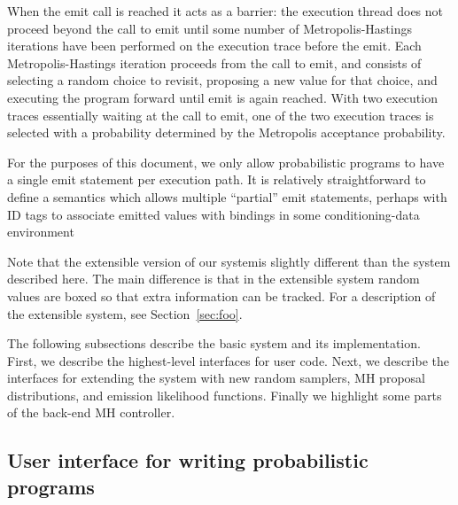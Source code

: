 \documentclass{article}
\begin{document}
When the emit call is reached it acts as a barrier: the execution thread does
not proceed beyond the call to emit until some number of Metropolis-Hastings
iterations have been performed on the execution trace before the emit.  Each
Metropolis-Hastings iteration proceeds from the call to emit, and consists of
selecting a random choice to revisit, proposing a new value for that choice,
and executing the program forward until emit is again reached. With two
execution traces essentially waiting at the call to emit, one of the two
execution traces is selected with a probability determined by the Metropolis
acceptance probability.

For the purposes of this document, we only allow probabilistic programs to have
a single emit statement per execution path. It is relatively straightforward to
define a semantics which allows multiple ``partial'' emit statements, perhaps
with ID tags to associate emitted values with bindings in some
conditioning-data environment

Note that the extensible version of our systemis slightly different than the
system described here. The main difference is that in the extensible system
random values are boxed so that extra information can be tracked. For a
description of the extensible system, see Section~\ref{sec:foo}.

The following subsections describe the basic system and its implementation.
First, we describe the highest-level interfaces for user code. Next, we
describe the interfaces for extending the system with new random samplers, MH
proposal distributions, and emission likelihood functions. Finally we highlight
some parts of the back-end MH controller.

\subsection{User interface for writing probabilistic programs}
\end{document}
